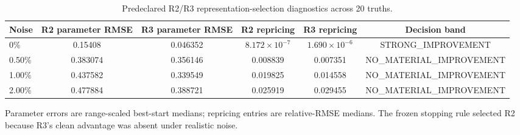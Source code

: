 \begin{table}[htbp]
\centering
\caption{Predeclared R2/R3 representation-selection diagnostics across 20 truths.}
\label{tab:r2-selection}
\begin{tabular}{lccccc}
\toprule
Noise & R2 parameter RMSE & R3 parameter RMSE & R2 repricing & R3 repricing & Decision band \\
\midrule
0\% & 0.15408 & 0.046352 & $8.172 \times 10^{-7}$ & $1.690 \times 10^{-6}$ & STRONG\_IMPROVEMENT \\
0.50\% & 0.383074 & 0.356146 & 0.008839 & 0.007351 & NO\_MATERIAL\_IMPROVEMENT \\
1.00\% & 0.437582 & 0.339549 & 0.019825 & 0.014558 & NO\_MATERIAL\_IMPROVEMENT \\
2.00\% & 0.477884 & 0.388721 & 0.025919 & 0.029455 & NO\_MATERIAL\_IMPROVEMENT \\
\bottomrule
\end{tabular}
\par\vspace{0.35em}
\begin{minipage}{0.94\linewidth}\small Parameter errors are range-scaled best-start medians; repricing entries are relative-RMSE medians. The frozen stopping rule selected R2 because R3's clean advantage was absent under realistic noise.\end{minipage}
\end{table}
